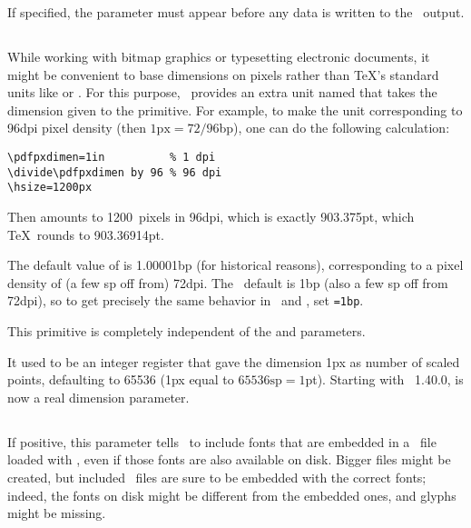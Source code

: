 \documentclass{pdftexmanual}
\begin{document}
If specified, the parameter must appear before any data is written to
the \PDF\ output. 

\subsection{}

While working with bitmap graphics or typesetting electronic documents,
it might be convenient to base dimensions on pixels rather than \TeX's
standard units like  or . For this purpose, \PDFTEX\
provides an extra unit named  that takes the dimension given to
the \cs{pdfpxdimen} primitive. For example, to make the unit \type{px}
corresponding to 96dpi pixel density (then $\mbox{1px}=72/96$bp), one
can do the following calculation:

\begin{verbatim}
\pdfpxdimen=1in          % 1 dpi
\divide\pdfpxdimen by 96 % 96 dpi
\hsize=1200px
\end{verbatim}

Then  amounts to 1200~pixels in 96dpi, which is exactly
903.375pt, which \TeX\ rounds to 903.36914pt.

The default value of  is 1.00001bp (for historical
reasons), corresponding to a pixel density of (a few sp off from) 72dpi.
The \LUATEX\ default is 1bp (also a few sp off from 72dpi), so to get
precisely the same behavior in \PDFTEX\ and \LUATEX, set
\texttt{=1bp}.

This primitive is completely independent of the
 and  parameters.

 It used to be an integer register that gave the
dimension 1px as number of scaled points, defaulting to 65536 (1px equal
to $\mbox{65536sp}=1$pt). Starting with \PDFTEX\ 1.40.0, \cs{pdfpxdimen}
is now a real dimension parameter.

\subsection{}

If positive, this parameter tells \PDFTEX\ to include fonts that are
embedded in a \PDF\ file loaded with \cs{pdfximage}, even if those fonts
are also available on disk. Bigger files might be created, but included
\PDF\ files are sure to be embedded with the correct fonts; indeed, the
fonts on disk might be different from the embedded ones, and glyphs
might be missing.
\end{document}
